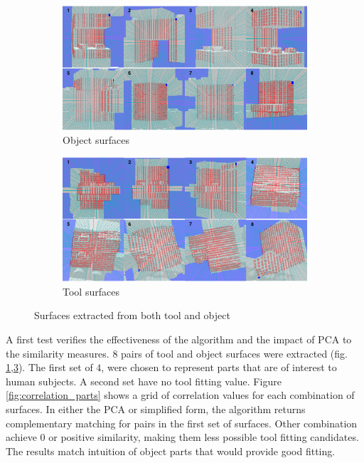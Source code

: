 \documentclass[11]{article}
\begin{document}
\begin{figure}[!h]
  \centering
  \begin{subfigure}{1\textwidth}
    \includegraphics[width=1\linewidth]{figures/object_parts.png}
    \caption{Object surfaces}
    \label{fig:obj_parts}
  \end{subfigure}
  \begin{subfigure}{1\textwidth}
    \includegraphics[width=1\linewidth]{figures/tool_parts.png}
    \caption{Tool surfaces}
    \label{fig:tool_part}
  \end{subfigure}
  \caption{Surfaces extracted from both tool and object}
\end{figure}

A first test verifies the effectiveness of the algorithm and the impact of PCA to the similarity measures. 
$8$ pairs of tool and object surfaces were extracted (fig. \ref{fig:obj_parts},\ref{fig:tool_part}). 
The first set of $4$, were chosen to represent parts that are of interest to human subjects. 
A second set have no tool fitting value. 
Figure \ref{fig:correlation_parts} shows a grid of correlation values for each combination of surfaces. 
In either the PCA or simplified form, the algorithm returns complementary matching for pairs in the first set of surfaces. 
Other combination achieve 0 or positive similarity, making them less possible tool fitting candidates. 
The results match intuition of object parts that would provide good fitting. 
\end{document}
